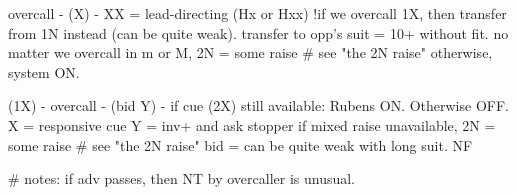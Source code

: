 overcall - (X) -
XX = lead-directing (Hx or Hxx)
!if we overcall 1X, then transfer from 1N instead (can be quite weak). transfer to opp's suit = 10+ without fit.
no matter we overcall in m or M, 2N = some raise  # see "the 2N raise"
otherwise, system ON.

(1X) - overcall - (bid Y) -
if cue (2X) still available: Rubens ON. Otherwise OFF.
X = responsive
cue Y = inv+ and ask stopper
if mixed raise unavailable, 2N = some raise  # see "the 2N raise"
bid = can be quite weak with long suit. NF

# notes:
if adv passes, then NT by overcaller is unusual.
